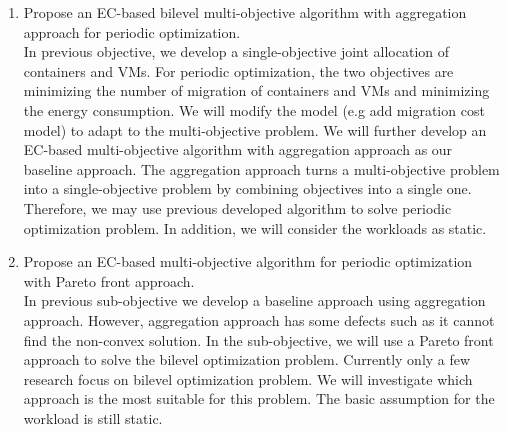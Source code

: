 \begin{enumerate}
	\item Propose an EC-based bilevel multi-objective algorithm with aggregation approach for periodic optimization. \\
	In previous objective, we develop a single-objective joint allocation of containers and VMs.  For periodic optimization, the two objectives are minimizing the number of migration of containers and VMs and minimizing the energy consumption. We will modify the model (e.g add migration cost model) to adapt to the multi-objective problem. We will further develop an EC-based multi-objective algorithm with aggregation approach as our baseline approach. The aggregation approach turns a multi-objective problem into a single-objective problem by combining objectives into a single one. Therefore, we may use previous developed algorithm to solve periodic optimization problem. In addition, we will consider the workloads as static. 

	\item Propose an EC-based multi-objective algorithm for periodic optimization with Pareto front approach.\\
	In previous sub-objective we develop a baseline approach using aggregation approach. However, aggregation approach has some defects such as it cannot find the non-convex solution. In the sub-objective, we will use a Pareto front approach to solve the bilevel optimization problem. Currently only a few research \cite{Yin:2000bt, Deb:2009jh,Deb:2010in} focus on bilevel optimization problem. We will investigate which approach is the most suitable for this problem.
	The basic assumption for the workload is still static.



\end{enumerate}
